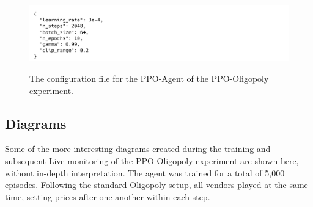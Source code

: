 \begin{figure}[ht]
	\includegraphics[width = \textwidth]{images/configs/PPOOligopoly/PPOOligopolyAgent.png}\\
	\caption{The configuration file for the PPO-Agent of the PPO-Oligopoly experiment.}\label{fig:PPOOligopolyConfigAgent}
\end{figure}

\clearpage
\subsection{Diagrams}\label{sec:AppendixOligopolyDiagrams}

Some of the more interesting diagrams created during the training and subsequent Live-monitoring of the PPO-Oligopoly experiment are shown here, without in-depth interpretation. The agent was trained for a total of 5,000 episodes. Following the standard Oligopoly setup, all vendors played at the same time, setting prices after one another within each step.

